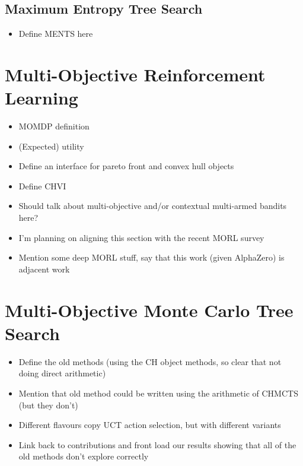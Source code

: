     \subsection{Maximum Entropy Tree Search}
    \label{sec:2-2-3-ments}
    
        \begin{itemize}
            \item Define MENTS here
        \end{itemize}

\section{Multi-Objective Reinforcement Learning}
\label{sec:2-3-morl}
    
    \begin{itemize}
        \item MOMDP definition
        \item (Expected) utility
        \item Define an interface for pareto front and convex hull objects
        \item Define CHVI
        \item Should talk about multi-objective and/or contextual multi-armed bandits here?
        \item I'm planning on aligning this section with the recent MORL survey \cite{morl_survey}
        \item Mention some deep MORL stuff, say that this work (given AlphaZero) is adjacent work
    \end{itemize}

\section{Multi-Objective Monte Carlo Tree Search}
\label{sec:2-4-momcts}


    \begin{itemize}
        \item Define the old methods (using the CH object methods, so clear that not doing direct arithmetic)
        \item Mention that old method could be written using the arithmetic of CHMCTS (but they don't) 
        \item Different flavours copy UCT action selection, but with different variants
        \item Link back to contributions and front load our results showing that all of the old methods don't explore correctly
    \end{itemize}

